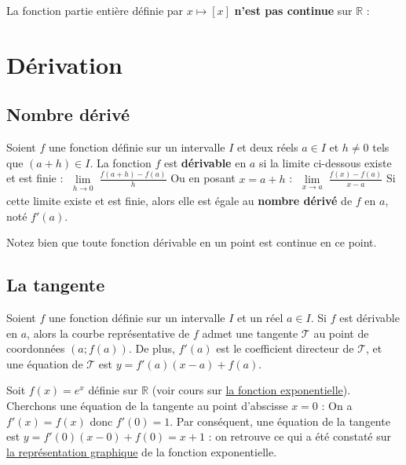 	La fonction partie entière définie par $x \mapsto [x]$ \textbf{n'est pas continue} sur $\mathbb{R}$ :


	\section{Dérivation}

	\subsection{Nombre dérivé}

	\begin{formula}[Définition]
		Soient $f$ une fonction définie sur un intervalle $I$ et deux réels $a \in I$ et $h \neq 0$ tels que $(a + h) \in I$.
		\newpar
		La fonction $f$ est \textbf{dérivable} en $a$ si la limite ci-dessous existe et est finie :
		\newpar
		$\displaystyle{\lim\limits_{\substack{h \rightarrow 0}} \frac{f(a + h) - f(a)}{h}}$
		\newpar
		Ou en posant $x = a + h$ :
		\newpar
		$\displaystyle{\lim\limits_{\substack{x \rightarrow a}} \frac{f(x) - f(a)}{x-a}}$
		\newpar
		Si cette limite existe et est finie, alors elle est égale au \textbf{nombre dérivé} de $f$ en $a$, noté $f'(a)$.
	\end{formula}

	\begin{tip}[Remarque]
		Notez bien que toute fonction dérivable en un point est continue en ce point.
	\end{tip}

	\subsection{La tangente}

	\begin{formula}
		Soient $f$ une fonction définie sur un intervalle $I$ et un réel $a \in I$. Si $f$ est dérivable en $a$, alors la courbe représentative de $f$ admet une tangente $\mathcal{T}$ au point de coordonnées $(a; f(a))$.
		\newpar
		De plus, $f'(a)$ est le coefficient directeur de $\mathcal{T}$, et une équation de $\mathcal{T}$ est $y = f'(a)(x-a)+f(a)$.
	\end{formula}

	\begin{tip}[Exemple]
		Soit $f(x) = e^x$ définie sur $\mathbb{R}$ (voir cours sur \href{https://bacomathiqu.es/cours/premiere/fonction-exponentielle/}{la fonction exponentielle}).
		\newpar
		Cherchons une équation de la tangente au point d'abscisse $x = 0$ :
		\newpar
		On a $f'(x) = f(x)$ donc $f'(0) = 1$.
		\newpar
		Par conséquent, une équation de la tangente est $y = f'(0)(x-0)+f(0) = x + 1$ :
		on retrouve ce qui a été constaté sur \href{https://bacomathiqu.es/cours/premiere/fonction-exponentielle/#3-représentation-graphique}{la représentation graphique} de la fonction exponentielle.
	\end{tip}

